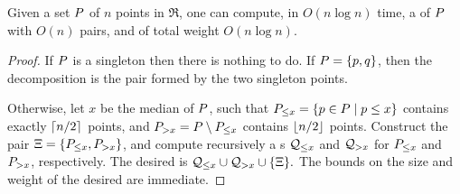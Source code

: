 \documentclass[12pt]{article}%
\begin{document}
\begin{lemma}
    Given a set $P$ of $n$ points in $\Re$, one can compute, in
    $O( n \log n)$ time, a \QSPD of $P$ with $O(n)$ pairs, and of
    total weight $O( n \log n)$.
\end{lemma}
\begin{proof}
    If $P$ is a singleton then there is nothing to do. If
    $P = \{ p, q \}$, then the decomposition is the pair formed
    by the two singleton points.

    Otherwise, let $x$ be the median of $P$, such that
    $P_{\leq x} = \left\{  p \in P  \;\middle\vert\; p \leq x \right\}$ contains exactly
    $\left\lceil {n/2} \right\rceil$ points, and $P_{> x} = P \setminus P_{\leq x}$
    contains $\left\lfloor {n/2} \right\rfloor$ points. Construct the pair
    $\Xi = \{ P_{\leq x}, P_{> x} \}$, and compute recursively a
    \QSPD{}s $\mathcal{Q}_{\leq x}$ and $\mathcal{Q}_{> x}$ for $P_{\leq x}$ and
    $P_{> x}$, respectively. The desired \QSPD is
    \begin{math}
        \mathcal{Q}_{\leq x} \cup \mathcal{Q}_{> x} \cup \{ \Xi \}.
    \end{math}
    The bounds on the size and weight of the desired \QSPD are
    immediate.
\end{proof}
\end{document}

